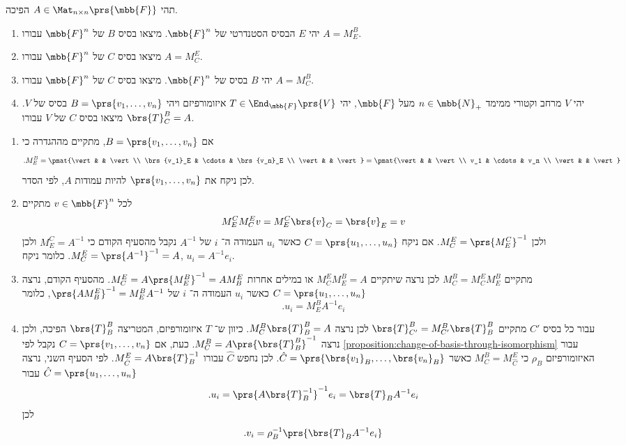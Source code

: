 \documentclass[a4paper,10pt,twoside,openany]{book}
\begin{document}
\begin{exercisechap}
תהי
$A \in \Mat_{n \times n}\prs{\mbb{F}}$
הפיכה.
\begin{enumerate}
\item יהי
$E$
הבסיס הסטנדרטי של
$\mbb{F}^n$.
מיצאו בסיס
$B$
של
$\mbb{F}^n$
עבורו
$A = M^B_E$.

\item
מיצאו בסיס
$C$
של
$\mbb{F}^n$
עבורו
$A = M^E_C$.

\item
יהי
$B$
בסיס של
$\mbb{F}^n$.
מיצאו בסיס
$C$
של
$\mbb{F}^n$
עבורו
$A = M^B_C$.

\item
יהי
$V$
מרחב וקטורי ממימד
$n \in \mbb{N}_+$
מעל
$\mbb{F}$,
יהי
$T \in \End_{\mbb{F}}\prs{V}$
איזומורפיזם
ויהי
$B = \prs{v_1, \ldots, v_n}$
בסיס של
$V$.
מיצאו בסיס
$C$
של
$V$
עבורו
$\brs{T}^B_C = A$.
\end{enumerate}
\end{exercisechap}

\begin{solution}
\begin{enumerate}
\item
אם
$B = \prs{v_1, \ldots, v_n}$,
מתקיים מההגדרה כי
\[\text{.} M^B_E = \pmat{\vert & & \vert \\ \brs{v_1}_E & \cdots & \brs{v_n}_E \\ \vert & & \vert} = \pmat{\vert & & \vert \\ v_1 & \cdots & v_n \\ \vert & & \vert}\]
לכן ניקח את
$\prs{v_1, \ldots, v_n}$
להיות עמודות
$A$,
לפי הסדר.

\item
לכל
$v \in \mbb{F}^n$
מתקיים
\[M^C_E M^E_C v = M^C_E \brs{v}_C = \brs{v}_E = v\]
ולכן
$M^E_C = \prs{M^C_E}^{-1}$.
אם ניקח
$C = \prs{u_1, \ldots, u_n}$
כאשר
$u_i$
העמודה ה־%
$i$
של
$A^{-1}$
נקבל מהסעיף הקודם כי
$M^C_E = A^{-1}$
ולכן
$M^E_C = \prs{A^{-1}}^{-1} = A$.
כלומר ניקח,
$u_i = A^{-1} e_i$.

\item
מתקיים
$M^B_C = M^E_C M^B_E$
לכן נרצה שיתקיים
$M^E_C M^B_E = A$
או במילים אחרות
$M^E_C = A \prs{M^B_E}^{-1} = A M^E_B$.
מהסעיף הקודם, נרצה
$C = \prs{u_1, \ldots, u_n}$
כאשר
$u_i$
העמודה ה־%
$i$
של
$\prs{A M^E_B}^{-1} = M^B_E A^{-1}$,
כלומר
\[\text{.} u_i = M^B_E A^{-1} e_i\]

\item
עבור כל בסיס
$C'$
מתקיים
$\brs{T}^B_{C'} = M^B_{C'} \brs{T}^B_B$
לכן נרצה
$M^B_C \brs{T}^B_B = A$.
כיוון ש־%
$T$
איזומורפיזם, המטריצה
$\brs{T}^B_B$
הפיכה, ולכן נרצה
$M^B_C = A \prs{\brs{T}^B_B}^{-1}$.
כעת, אם
$C = \prs{v_1, \ldots, v_n}$
נקבל לפי
\ref{proposition:change-of-basis-through-isomorphism}
עבור האיזומורפיזם
$\rho_B$
כי
$M^B_C = M^E_{\hat{C}}$
כאשר
$\hat{C} = \prs{\brs{v_1}_B, \ldots, \brs{v_n}_B}$.
לכן נחפש
$\hat{C}$
עבורו
$M^E_{\hat{C}} = A \brs{T}_B^{-1}$.
לפי הסעיף השני, נרצה
$\hat{C} = \prs{u_1, \ldots, u_n}$
עבור
\[\text{.} u_i = \prs{A \brs{T}_B^{-1}}^{-1} e_i = \brs{T}_B A^{-1} e_i\]
לכן
\[\text{.} v_i = \rho_B^{-1} \prs{\brs{T}_B A^{-1} e_i}\]
\end{enumerate}
\end{solution}
\end{document}
